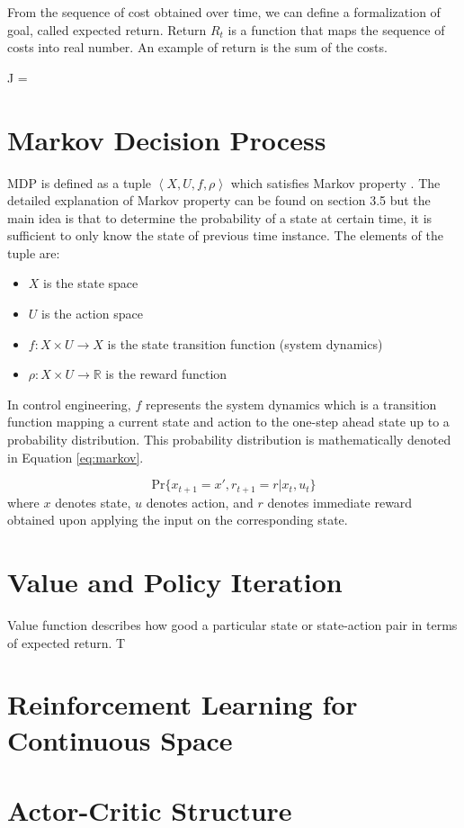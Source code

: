 From the sequence of cost obtained over time, we can define a formalization of goal, called expected return. Return $R_t$ is a function that maps the sequence of costs into real number. An example of return is the sum of the costs.

J =  

\section{Markov Decision Process} \label{sec:mdp}
\ac{MDP} is defined as a tuple $\left<X, U, f, \rho \right>$ which satisfies Markov property \cite{babuskaRL}. The detailed explanation of Markov property can be found on \cite{sutton1998reinforcement} section 3.5 but the main idea is that to determine the probability of a state at certain time, it is sufficient to only know the state of previous time instance. The elements of the tuple are:
\begin{itemize}
	\item $X$ is the state space
	\item $U$ is the action space
	\item $f :X \times U \rightarrow X$ is the state transition function (system dynamics) 
	\item $\rho:X \times U \rightarrow \mathbb{R}$ is the reward function
\end{itemize}

In control engineering, $f$ represents the system dynamics which is a transition function mapping a current state and action to the one-step ahead state up to a probability distribution. This probability distribution is mathematically denoted in Equation \eqref{eq:markov}.

\begin{equation}
	\text{Pr}\{x_{t+1} = x', r_{t+1} = r| x_t, u_t \}
	\label{eq:markov}
\end{equation}
where $x$ denotes state, $u$ denotes action, and $r$ denotes immediate reward obtained upon applying the input on the corresponding state.

\section{Value and Policy Iteration} \label{sec:value_iter}
Value function describes how good a particular state or state-action pair in terms of expected return. T


\section{Reinforcement Learning for Continuous Space}


\section{Actor-Critic Structure} \label{sec:actor}
